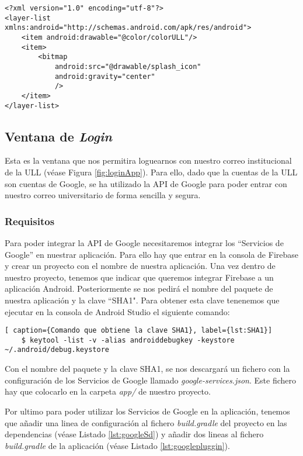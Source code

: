 \begin{lstlisting}[caption={Fichero  \textit{splash\_ull.xml}, xml con el color de fondo y el logotipo de la aplicación }, label={lst:splashull}]
<?xml version="1.0" encoding="utf-8"?>
<layer-list xmlns:android="http://schemas.android.com/apk/res/android">
    <item android:drawable="@color/colorULL"/>
    <item>
        <bitmap
            android:src="@drawable/splash_icon"
            android:gravity="center"
            />
    </item>
</layer-list>
\end{lstlisting}

\subsection{Ventana de \textit{Login} }

Esta es la ventana que nos permitira loguearnos con nuestro correo institucional de la ULL (véase Figura \ref{fig:loginApp}). Para ello, dado que la cuentas de la ULL son cuentas de Google, se ha utilizado la API de Google para poder entrar con nuestro correo universitario de forma sencilla y segura.

\subsubsection{ Requisitos }  

Para poder integrar la API de Google necesitaremos integrar los ``Servicios de Google'' en nuestrar aplicación. Para ello hay que entrar en la consola de Firebase \cite{URL::Firebase} y crear un proyecto con el nombre de nuestra aplicación. Una vez dentro de nuestro proyecto, tenemos que indicar que queremos integrar Firebase a un aplicación Android. Posteriormente se nos pedirá el nombre del paquete de nuestra aplicación y la clave ``SHA1". Para obtener esta clave tenenemos que ejecutar en la consola de Android Studio el siguiente comando: 
 
\begin{lstlisting}[ caption={Comando que obtiene la clave SHA1}, label={lst:SHA1}]
    $ keytool -list -v -alias androiddebugkey -keystore ~/.android/debug.keystore
\end{lstlisting} 

Con el nombre del paquete y la clave SHA1, se nos descargará un fichero  con la configuración de los Servicios de Google llamado \textit{google-services.json}. Este fichero hay que colocarlo en la carpeta \textit{app/} de nuestro proyecto.
 
Por ultimo para poder utilizar los Servicios de Google en la aplicación, tenemos que añadir una linea de configuración al fichero \textit{build.gradle} del proyecto en las dependencias (véase Listado \ref{lst:googleSd}) y añadir dos lineas al fichero \textit{build.gradle} de la aplicación (véase Listado \ref{lst:googlepluggin}).

